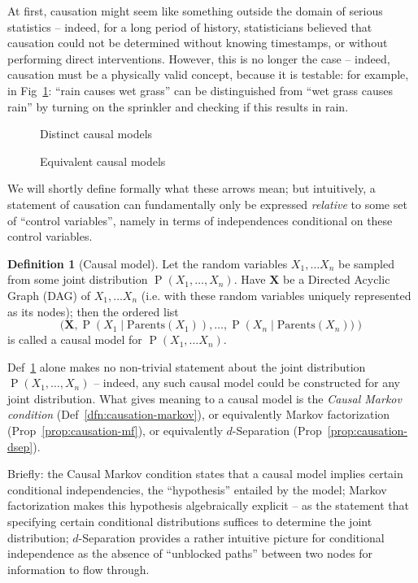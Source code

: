 \documentclass[12pt]{article}
\newcommand{\Prob}[1]{\operatorname{P}\left(#1\right)}
\theoremstyle{definition}
\newtheorem{dfn}[thm]{Definition}
\numberwithin{equation}{section}
\numberwithin{figure}{section}
\numberwithin{table}{section}
\begin{document}
At first, causation might seem like something outside the domain of serious statistics -- indeed, for a long period of history, statisticians believed that causation could not be determined without knowing timestamps, or without performing direct interventions. However, this is no longer the case -- indeed, causation must be a physically valid concept, because it is testable: for example, in Fig~\ref{fig:causation-distinct}: ``rain causes wet grass'' can be distinguished from ``wet grass causes rain'' by turning on the sprinkler and checking if this results in rain. 

\begin{figure}
    \centering
    
    \caption{Distinct causal models}
    \label{fig:causation-distinct}
\end{figure}

\begin{figure}
    \centering
    
    \caption{Equivalent causal models}
    \label{fig:causation-identical}
\end{figure}

We will shortly define formally what these arrows mean; but intuitively, a statement of causation can fundamentally only be expressed \emph{relative} to some set of ``control variables'', namely in terms of independences conditional on these control variables. 

\begin{dfn}[Causal model]
    \label{dfn:causation}
    Let the random variables $X_1,\dots X_n$ be sampled from some joint distribution $\Prob{X_1,\dots,X_n}$. Have $\mathbf{X}$ be a Directed Acyclic Graph (DAG) of $X_1,\dots X_n$ (i.e. with these random variables uniquely represented as its nodes); then the ordered list $$(\mathbf{X}, \Prob{X_1\mid\mathrm{Parents}(X_1)}, \dots, \Prob{X_n\mid\mathrm{Parents}(X_n))}$$ is called a causal model for $\Prob{X_1,\dots X_n}$.
\end{dfn}

Def~\ref{dfn:causation} alone makes no non-trivial statement about the joint distribution $\Prob{X_1,\dots,X_n}$ -- indeed, any such causal model could be constructed for any joint distribution. What gives meaning to a causal model is the \emph{Causal Markov condition} (Def~\ref{dfn:causation-markov}), or equivalently Markov factorization (Prop~\ref{prop:causation-mf}), or equivalently $d$-Separation (Prop~\ref{prop:causation-dsep}). 

Briefly: the Causal Markov condition states that a causal model implies certain conditional independencies, the ``hypothesis'' entailed by the model; Markov factorization makes this hypothesis algebraically explicit -- as the statement that specifying certain conditional distributions suffices to determine the joint distribution; $d$-Separation provides a rather intuitive picture for conditional independence as the absence of ``unblocked paths'' between two nodes for information to flow through.
\end{document}
